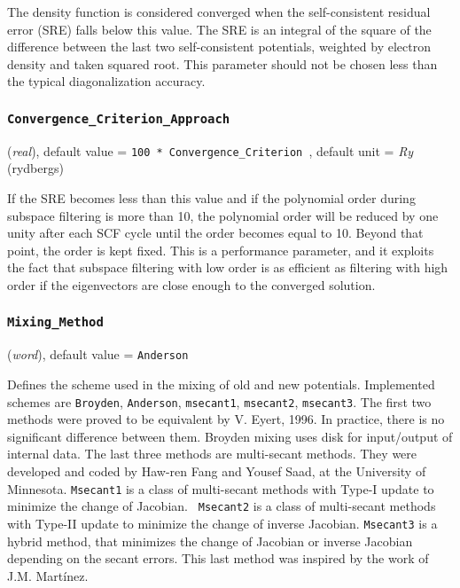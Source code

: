\documentclass{article}
\begin{document}
The density function is considered converged when the self-consistent
residual error (SRE) falls below this value. The SRE is an integral of the
square of the difference between the last two self-consistent potentials,
weighted by electron density and taken squared root. This parameter should
not be chosen less than the typical diagonalization accuracy.

\subsubsection{\tt Convergence\_Criterion\_Approach
\label{ConvergenceCriterionApproach}}
({\it real}),
default value = {\tt 100 * Convergence\_Criterion },
default unit = {\it Ry} (rydbergs)

If the SRE becomes less than this value and if the polynomial order during
subspace filtering is more than 10, the polynomial order will be reduced
by one unity after each SCF cycle until the order becomes equal to 10.
Beyond that point, the order is kept fixed. This is a performance parameter,
and it exploits the fact that subspace filtering with low order is as efficient
as filtering with high order if the eigenvectors are close enough to the
converged solution.

\subsubsection{\tt Mixing\_Method 
\label{MixingMethod}}
({\it word}),
default value = {\tt Anderson }

Defines the scheme used in the mixing of old and new potentials. 
Implemented schemes are {\tt Broyden}, {\tt Anderson}, {\tt msecant1}, 
{\tt msecant2}, {\tt msecant3}. The first two methods were proved to be 
equivalent by V. Eyert, 1996. In practice, there is no significant 
difference between them. Broyden mixing uses disk for input/output of 
internal data. The last three methods are multi-secant methods. They 
were developed and coded by Haw-ren Fang and Yousef Saad, at the 
University of Minnesota. {\tt Msecant1} is a class of multi-secant 
methods with Type-I update to minimize the change of Jacobian. {\tt 
Msecant2} is a class of multi-secant methods with Type-II update to 
minimize the change of inverse Jacobian. {\tt Msecant3} is a hybrid 
method, that minimizes the change of Jacobian or inverse Jacobian 
depending on the secant errors. This last method was inspired by the 
work of J.M. Mart{\'i}nez.
\end{document}
